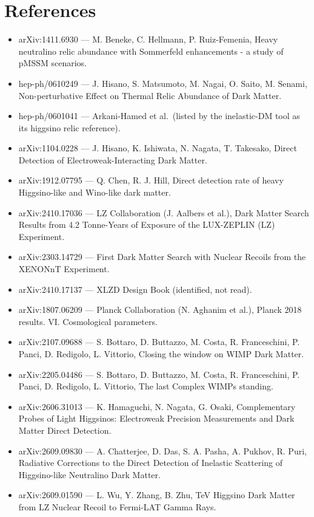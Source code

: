 \documentclass[11pt,a4paper]{article}
\begin{document}
\section*{References}
\begin{itemize}
\item arXiv:1411.6930 --- M. Beneke, C. Hellmann, P. Ruiz-Femenia, Heavy neutralino relic abundance with Sommerfeld enhancements - a study of pMSSM scenarios.
\item hep-ph/0610249 --- J. Hisano, S. Matsumoto, M. Nagai, O. Saito, M. Senami, Non-perturbative Effect on Thermal Relic Abundance of Dark Matter.
\item hep-ph/0601041 --- Arkani-Hamed et al.\ (listed by the inelastic-DM tool as its higgsino relic reference).
\item arXiv:1104.0228 --- J. Hisano, K. Ishiwata, N. Nagata, T. Takesako, Direct Detection of Electroweak-Interacting Dark Matter.
\item arXiv:1912.07795 --- Q. Chen, R. J. Hill, Direct detection rate of heavy Higgsino-like and Wino-like dark matter.
\item arXiv:2410.17036 --- LZ Collaboration (J. Aalbers et al.), Dark Matter Search Results from 4.2 Tonne-Years of Exposure of the LUX-ZEPLIN (LZ) Experiment.
\item arXiv:2303.14729 --- First Dark Matter Search with Nuclear Recoils from the XENONnT Experiment.
\item arXiv:2410.17137 --- XLZD Design Book (identified, not read).
\item arXiv:1807.06209 --- Planck Collaboration (N. Aghanim et al.), Planck 2018 results. VI. Cosmological parameters.
\item arXiv:2107.09688 --- S. Bottaro, D. Buttazzo, M. Costa, R. Franceschini, P. Panci, D. Redigolo, L. Vittorio, Closing the window on WIMP Dark Matter.
\item arXiv:2205.04486 --- S. Bottaro, D. Buttazzo, M. Costa, R. Franceschini, P. Panci, D. Redigolo, L. Vittorio, The last Complex WIMPs standing.
\item arXiv:2606.31013 --- K. Hamaguchi, N. Nagata, G. Osaki, Complementary Probes of Light Higgsinos: Electroweak Precision Measurements and Dark Matter Direct Detection.
\item arXiv:2609.09830 --- A. Chatterjee, D. Das, S. A. Pasha, A. Pukhov, R. Puri, Radiative Corrections to the Direct Detection of Inelastic Scattering of Higgsino-like Neutralino Dark Matter.
\item arXiv:2609.01590 --- L. Wu, Y. Zhang, B. Zhu, TeV Higgsino Dark Matter from LZ Nuclear Recoil to Fermi-LAT Gamma Rays.

\end{itemize}
\end{document}
